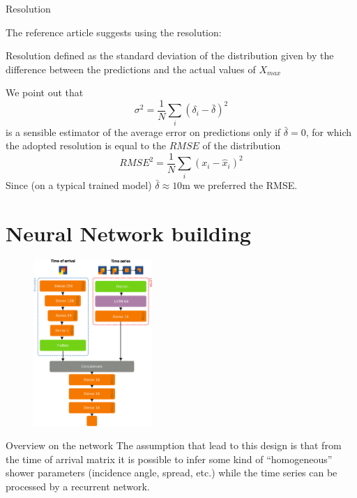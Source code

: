 \documentclass{beamer}
\begin{document}

\begin{frame}{Resolution}

    The reference article suggests using the resolution:
    \begin{block}{Resolution}
        defined as the standard deviation of the distribution given by the difference between the predictions and the actual values of $X_{max}$
    \end{block}

    We point out that 
    \[\sigma^2 = \frac{1}{N}\sum_i (\delta_i - \bar{\delta})^2\]
    is a sensible estimator of the average error on predictions only if $\bar{\delta} = 0$, for which the adopted resolution is equal 
    to the $RMSE$ of the distribution
    \[ RMSE^2 = \frac{1}{N}\sum_i(x_i - \hat{x}_i)^2 \]
    Since (on a typical trained model) $\bar{\delta} \approx 10$m we preferred the RMSE.
\end{frame}



\section{Neural Network building}
    \begin{figure}
        \centering
        \includegraphics[width=0.4\textwidth]{figures/model.pdf}
    \end{figure}
\begin{frame}{Overview on the network}
    The assumption that lead to this design is that from the time of arrival matrix
    it is possible to infer some kind of ``homogeneous'' shower parameters (incidence angle, spread, etc.)
    while the time series can be processed by a recurrent network.
\end{frame}
\end{document}
